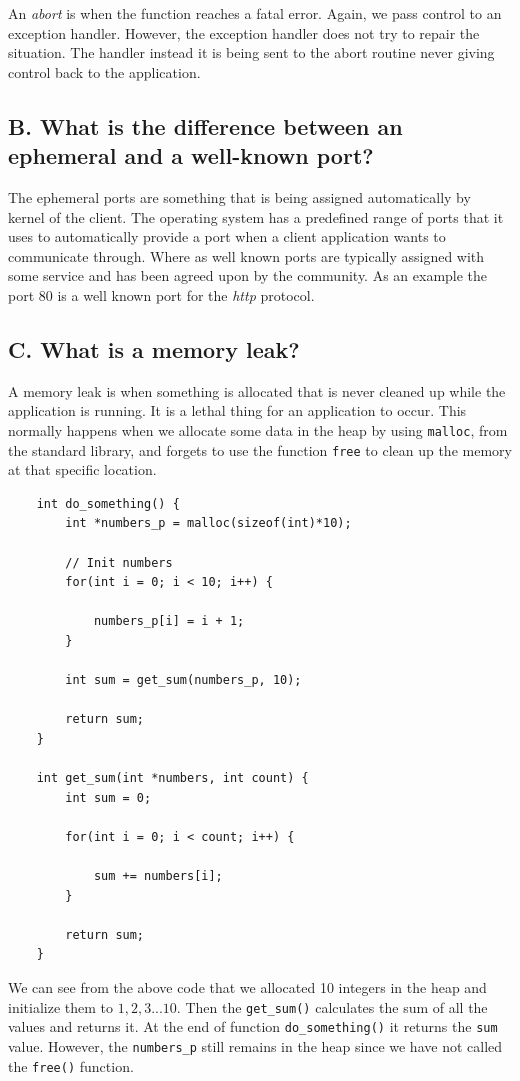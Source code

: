 \documentclass[11pt]{article}
\newcommand{\code}[1]{{\colorbox{lightgray!15}{\color{black}\texttt{#1}}}}
\begin{document}
An \textit{abort} is when the function reaches a fatal error. Again, we pass control to an exception handler.
However, the exception handler does not try to repair the situation. The handler instead it is being sent to the abort routine 
never giving control back to the application.

\subsection{B. What is the difference between an ephemeral and a well-known port?}
The ephemeral ports are something that is being assigned automatically by kernel of the client. The operating system has a predefined range of ports that it uses to automatically provide a port when a client application wants to communicate through. 
Where as well known ports are typically assigned with some service and has been 
agreed upon by the community. As an example the port 80 is a well known port for the \textit{http} protocol.

\subsection{C. What is a memory leak?}
A memory leak is when something is allocated that is never cleaned up while the application is running. 
It is a lethal thing for an application to occur. This normally happens when we allocate some data in the heap
by using \code{malloc}, from the standard library, and forgets to use the function \code{free} to clean up the memory
at that specific location.

\begin{lstlisting}
    int do_something() {
        int *numbers_p = malloc(sizeof(int)*10);

        // Init numbers
        for(int i = 0; i < 10; i++) {

            numbers_p[i] = i + 1;
        }

        int sum = get_sum(numbers_p, 10);
        
        return sum;
    }

    int get_sum(int *numbers, int count) {
        int sum = 0;

        for(int i = 0; i < count; i++) {

            sum += numbers[i];
        }

        return sum;
    }
\end{lstlisting}
We can see from the above code that we allocated 10 integers in the heap and initialize them 
to $1, 2, 3 ... 10$. Then the \code{get\_sum()} calculates the sum of all the values and returns it.
At the end of function \code{do\_something()} it returns the \code{sum} value. However, the \code{numbers\_p}
still remains in the heap since we have not called the \code{free()} function.
\end{document}
